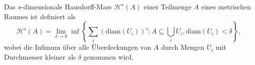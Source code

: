 \begin{definition}
    Das $s$-dimensionale Hausdorff-Mass $\mathcal{H}^s(A)$ einer Teilmenge $A$ eines metrischen Raumes ist definiert als
    \[
        \mathcal{H}^s(A) = \lim_{\delta \to 0} \inf \left\{ \sum_{i} (\text{diam}(U_i))^s : A \subseteq \bigcup_{i} U_i, \text{diam}(U_i) < \delta \right\},
    \]
    wobei die Infimum über alle Überdeckungen von $A$ durch Mengen $U_i$ mit Durchmesser kleiner als $\delta$ genommen wird.
    
\end{definition}